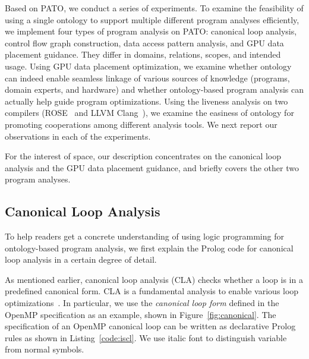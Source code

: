 Based on PATO, we conduct a series of experiments. To examine the
feasibility of using a single ontology to support multiple different
program analyses efficiently, we implement four types of program
analysis on PATO: canonical loop analysis, control flow graph
construction, data access pattern analysis, and GPU data placement
guidance. They differ in domains, relations, scopes, and intended
usage. Using GPU data placement optimization, we examine whether
ontology can indeed enable seamless linkage of various sources of
knowledge (programs, domain experts, and hardware) and whether
ontology-based program analysis can actually help guide program
optimizations. Using the liveness analysis on two compilers
(ROSE~\cite{ROSE} and LLVM Clang~\cite{Lattner2004}), we
examine the easiness of ontology for promoting cooperations among
different analysis tools. We next report our observations in each of
the experiments.

For the interest of space, our description concentrates on the 
canonical loop analysis and the GPU data placement guidance,
and briefly covers the other two program analyses.

\subsection{Canonical Loop Analysis}

To help readers get a concrete understanding of using logic programming
for ontology-based program analysis, we first explain the Prolog code
for canonical loop analysis in a certain degree of detail. 

As mentioned earlier, canonical loop analysis (CLA) checks whether a
loop is in a predefined canonical form.  CLA is a fundamental analysis
to enable various loop
optimizations~\cite{kandemir1999improving,LiaoSemantic-aware2010,DaMata2013}.
In particular, we use the \emph{canonical loop form} defined in the OpenMP specification \cite{openmp13} as an example, shown in Figure~\ref{fig:canonical}.  
The specification of an OpenMP canonical loop can be written as declarative Prolog rules as shown in Listing~\ref{code:iscl}.
We use italic font to distinguish variable from normal symbols.

